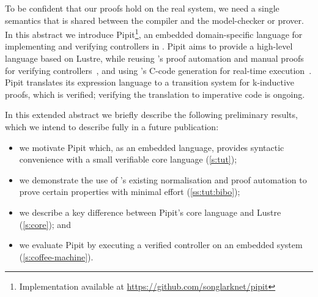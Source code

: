 \documentclass[sigplan,screen, review]{acmart}
\begin{document}
To be confident that our proofs hold on the real system, we need a single semantics that is shared between the compiler and the model-checker or prover.
In this abstract we introduce Pipit\footnote{Implementation available at \url{https://github.com/songlarknet/pipit}}, an embedded domain-specific language for implementing and verifying controllers in \fstar{}.
Pipit aims to provide a high-level language based on Lustre, while reusing \fstar{}'s proof automation and manual proofs for verifying controllers~\cite{martinez2019meta}, and using \lowstar{}'s C-code generation for real-time execution~\cite{protzenko2017verified}.
Pipit translates its expression language to a transition system for k-inductive proofs, which is verified; verifying the translation to imperative code is ongoing.

In this extended abstract we briefly describe the following preliminary results, which we intend to describe fully in a future publication:

\begin{itemize}
  \item we motivate Pipit which, as an embedded language, provides syntactic convenience with a small verifiable core language (\autoref{s:tut});
  \item we demonstrate the use of \fstar{}'s existing normalisation and proof automation to prove certain properties with minimal effort (\autoref{ss:tut:bibo});
  \item we describe a key difference between Pipit's core language and Lustre (\autoref{s:core}); and
  \item we evaluate Pipit by executing a verified controller on an embedded system (\autoref{s:coffee-machine}).
\end{itemize}

\end{document}
